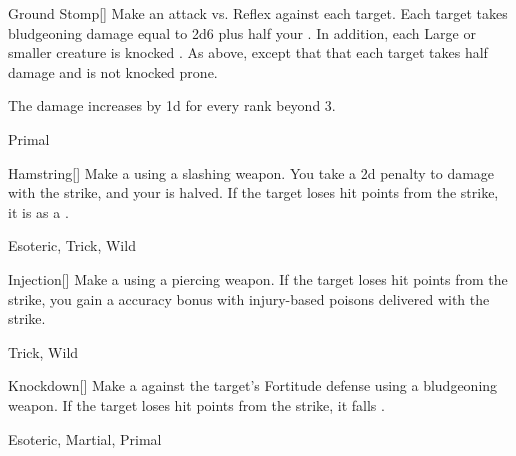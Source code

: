 \lowercase{\hypertarget{maneuver:Ground Stomp}{}}\label{maneuver:Ground Stomp}
\hypertarget{maneuver:Ground Stomp}{}
\begin{freeability}[Rank 3]{Ground Stomp}[]
Make an attack vs. Reflex against each target.
\hit Each target takes bludgeoning damage equal to 2d6 plus half your .
In addition, each Large or smaller creature is knocked .
\glance As above, except that that each target takes half damage and is not knocked prone.

\rankline
The damage increases by \plus1d for every rank beyond 3.


 Primal
\end{freeability}
\vspace{0.25em}



\lowercase{\hypertarget{maneuver:Hamstring}{}}\label{maneuver:Hamstring}
\hypertarget{maneuver:Hamstring}{}
\begin{freeability}[Rank 3]{Hamstring}[]
Make a  using a slashing weapon.
You take a \minus2d penalty to damage with the strike, and your  is halved.
If the target loses hit points from the strike, it is  as a .


 Esoteric, Trick, Wild
\end{freeability}
\vspace{0.25em}



\lowercase{\hypertarget{maneuver:Injection}{}}\label{maneuver:Injection}
\hypertarget{maneuver:Injection}{}
\begin{freeability}[Rank 3]{Injection}[]
Make a  using a piercing weapon.
If the target loses hit points from the strike, you gain a  accuracy bonus with injury-based poisons delivered with the strike.


 Trick, Wild
\end{freeability}
\vspace{0.25em}



\lowercase{\hypertarget{maneuver:Knockdown}{}}\label{maneuver:Knockdown}
\hypertarget{maneuver:Knockdown}{}
\begin{freeability}[Rank 3]{Knockdown}[]
Make a  against the target's Fortitude defense using a bludgeoning weapon.
If the target loses hit points from the strike, it falls .


 Esoteric, Martial, Primal
\end{freeability}
\vspace{0.25em}



